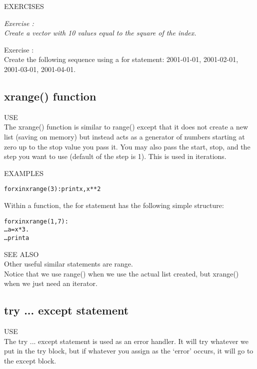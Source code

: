 {\color{blue} {\sf\small EXERCISES}} \\
{\it Exercise  :  \\
Create a vector with 10 values equal to the square of the index.

Exercise  :  \\
Create the following sequence using a {\sf\small for} statement:
2001-01-01, 2001-02-01, 2001-03-01, 2001-04-01.}



\subsection{ {\sf xrange() } function}
{\color{blue} {\sf\small USE}} \\

The {\sf\small xrange()} function is similar to {\sf \small range()}
except that it does not create a new list (saving on memory) but
instead acts as a generator of numbers starting at zero up to the stop
value you pass it.  You may also pass the start, stop, and the step
you want to use (default of the step is 1).  This is used in iterations.

{\color{blue} {\sf\small EXAMPLES}} 
\begin{alltt}
\pytab for x in xrange(3): print x, x ** 2
\end{alltt}
Within a function, the {\sf\small for }  statement has the following
simple structure: 
\begin{alltt}
\pytab for x in xrange(1,7): 
\ldots    a = x * 3. 
\ldots    print a 
\end{alltt}
  
{\color{blue} {\sf\small SEE ALSO}} \\
Other useful similar statements are {\sf\small range}.  \\

Notice that we use {\sf \small range()} when we use the actual list
created, but {\sf \small xrange()} when we just need an iterator.  

\subsection{ {\sf try ... except } statement}
{\color{blue} {\sf\small USE}} \\
The {\sf\small try ... except} statement is used as an error
handler.  It will try whatever we put in the {\sf\small try} block,
but if whatever you assign as the `error' occurs, it will go to the
{\sf\small except} block.

